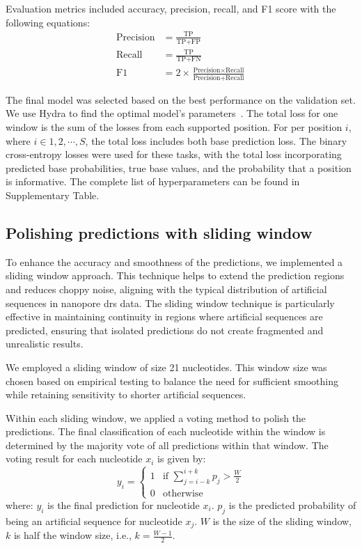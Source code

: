 \documentclass[pdflatex, sn-mathphys-num, lineno]{sn-jnl}%
\theoremstyle{thmstyleone}%
\theoremstyle{thmstyletwo}%
\theoremstyle{thmstylethree}%
\begin{document}
Evaluation metrics included accuracy, precision, recall, and F1 score with the following equations:
\begin{align*}
	\textrm{Precision} & = \frac{\textrm{TP}}{\textrm{TP}+\textrm{FP}}                                                     \\
	\textrm{Recall}    & = \frac{\textrm{TP}}{\textrm{TP}+\textrm{FN}}                                                     \\
	\textrm{F1}        & = 2 \times \frac{\textrm{Precision} \times \textrm{Recall}}{\textrm{Precision} + \textrm{Recall}}
\end{align*}

The final model was selected based on the best performance on the validation set.
We use Hydra to find the optimal model's parameters~\cite{Yadan2019Hydra}.
The total loss for one window is the sum of the losses from each supported position.
For per position  \( i \), where \( i  \in {1,2, \cdots, S} \),  the total loss includes both base prediction loss.
The binary cross-entropy losses were used for these tasks, with the total loss incorporating predicted base probabilities, true base values, and the probability that a position is informative.
The complete list of hyperparameters can be found in Supplementary Table.

\subsection{Polishing predictions with sliding window}

To enhance the accuracy and smoothness of the predictions, we implemented a sliding window approach.
This technique helps to extend the prediction regions and reduces choppy noise, aligning with the typical distribution of artificial sequences in nanopore \gls{drs} data.
The sliding window technique is particularly effective in maintaining continuity in regions where artificial sequences are predicted, ensuring that isolated predictions do not create fragmented and unrealistic results.

We employed a sliding window of size 21 nucleotides.
This window size was chosen based on empirical testing to balance the need for sufficient smoothing while retaining sensitivity to shorter artificial sequences.

Within each sliding window, we applied a voting method to polish the predictions.
The final classification of each nucleotide within the window is determined by the majority vote of all predictions within that window.
The voting result for each nucleotide \( x_i \) is given by:
\[
y_i = \begin{cases}
    1 & \text{if } \sum_{j=i-k}^{i+k} p_j > \frac{W}{2} \\
    0 & \text{otherwise}
\end{cases}
\]
where: \( y_i \) is the final prediction for nucleotide \( x_i \). \( p_j \) is the predicted probability of being an artificial sequence for nucleotide \( x_j \). \( W \) is the size of the sliding window, \( k \) is half the window size, i.e., \( k = \frac{W-1}{2} \).
\end{document}
